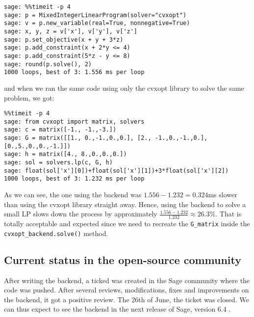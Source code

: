 \begin{verbatim}
sage: %%timeit -p 4
sage: p = MixedIntegerLinearProgram(solver="cvxopt")
sage: v = p.new_variable(real=True, nonnegative=True)
sage: x, y, z = v['x'], v['y'], v['z']
sage: p.set_objective(x + y + 3*z)
sage: p.add_constraint(x + 2*y <= 4)
sage: p.add_constraint(5*z - y <= 8)
sage: round(p.solve(), 2)
1000 loops, best of 3: 1.556 ms per loop
\end{verbatim}

and when we ran the same code using only the cvxopt library to solve the same problem, we got:

\begin{verbatim}
%%timeit -p 4 
sage: from cvxopt import matrix, solvers
sage: c = matrix([-1., -1.,-3.])
sage: G = matrix([[1., 0.,-1.,0.,0.], [2., -1.,0.,-1.,0.],[0.,5.,0.,0.,-1.]])
sage: h = matrix([4., 8.,0.,0.,0.])
sage: sol = solvers.lp(c, G, h)
sage: float(sol['x'][0])+float(sol['x'][1])+3*float(sol['x'][2])
1000 loops, best of 3: 1.232 ms per loop
\end{verbatim}

As we can see, the one using the backend was $1.556 - 1.232 = 0.324$ms slower than using the cvxopt library straight away. Hence, using the backend to solve a small LP slows down the process by approximately $\frac{1.556 - 1.232}{1.232} \approx 26.3\%$. That is totally acceptable and expected since we need to recreate the \texttt{G\_matrix} inside the \texttt{cvxopt\_backend.solve()} method.



\subsection{Current status in the open-source community}
After writing the backend, a ticked was created in the Sage community where the code was pushed. After several reviews, modifications, fixes and improvements on the backend, it got a positive review. The 26th of June, the ticket was closed. We can thus expect to see the backend in the next release of Sage, version 6.4 \cite{ticketlp}.






